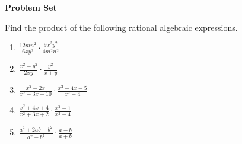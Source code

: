 \textbf{Problem Set}

\vspce

Find the product of the following rational algebraic expressions. 

\vspce

\begin{enumerate}[label = \arabic*. ]

\item \hspce $\displaystyle \frac{12mn^2}{6xy^2} \cdot \frac{9x^2y^2}{4m^2n^2}$ 
\vspce
\item \hspce $\displaystyle \frac{x^2-y^2}{2xy} \cdot \frac{y^2}{x+y}$ 
\vspce
\item \hspce $\displaystyle \frac{x^2-2x}{x^{2}-3x-10} \cdot \frac{x^2-4x-5}{x^2-4}$
\vspce
\item \hspce $\displaystyle \frac{x^2+4x+4}{x^{2}+3x+2} \cdot \frac{x^2-1}{x^{2}-4}$
\vspce
\item \hspce $\displaystyle \frac{a^2+2ab+b^2}{a^2-b^2} \cdot \frac{a-b}{a+b}$

\end{enumerate}